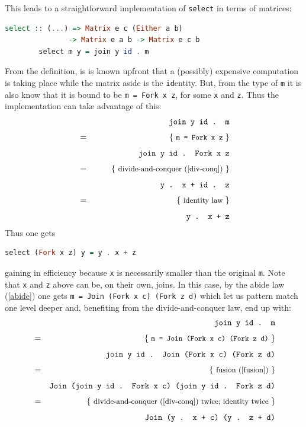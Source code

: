 \documentclass[
  oneside,
  11pt, a4paper,
  footinclude=true,
  headinclude=true,
  cleardoublepage=empty
]{scrbook}
\theoremstyle{definition}
\theoremstyle{definition}
\def\start{&&}
\def\just#1#2{\\ &#1& \rule{2em}{0pt} \{ \mbox{\rule[-.7em]{0pt}{1.8em} \small #2 \/} \} \nonumber\\ && }
\begin{document}
        This leads to a straightforward implementation of \texttt{select} in terms of matrices:
        
        \begin{lstlisting}[language=Haskell, caption={\texttt{select} in terms of matrices},captionpos=b]
        select :: (...) => Matrix e c (Either a b) 
               -> Matrix e a b -> Matrix e c b
        select m y = join y id . m
        \end{lstlisting}{}
        
        From the definition, is is known upfront that a (possibly) expensive computation is taking place while the matrix aside is the \texttt{id}entity. But, from the type of \texttt{m} it is also know that it is bound to be \texttt{m = Fork x z}, for some \texttt{x} and \texttt{z}. Thus the implementation can take advantage of this: \small
        \begin{eqnarray*}
        \start
            \texttt{join y id . m}
        \just={\texttt{m = Fork x z}}
            \texttt{join y id . Fork x z}
        \just={ divide-and-conquer (\ref{div-conq}) }
            \texttt{y . x + id . z}
        \just={ identity law }
            \texttt{y . x + z}
        \end{eqnarray*}\normalsize
        Thus one gets
        \begin{lstlisting}[language=Haskell, caption={\texttt{Fork x z} pattern match case},captionpos=b]
        select (Fork x z) y = y . x + z
        \end{lstlisting}{}
        gaining in efficiency because \texttt{x} is necessarily smaller than the original \texttt{m}.
        Note that \texttt{x} and \texttt{z} above can be, on their own, joins. In this case, by the abide law (\ref{abide}) one gets \texttt{m = Join (Fork x c) (Fork z d)} which let us pattern match one level deeper and, benefiting from the divide-and-conquer law, end up with: \small
        \begin{eqnarray*}
        \start
            \texttt{join y id . m}
        \just={\texttt{m = Join (Fork x c) (Fork z d)}}
            \texttt{join y id . Join (Fork x c) (Fork z d)}
        \just={ fusion (\ref{fusion}) }
            \texttt{Join (join y id . Fork x c) (join y id . Fork z d)}
        \just={ divide-and-conquer  (\ref{div-conq}) twice; identity twice }
            \texttt{Join (y . x + c) (y . z + d)}
        \end{eqnarray*}\normalsize
        
\end{document}
